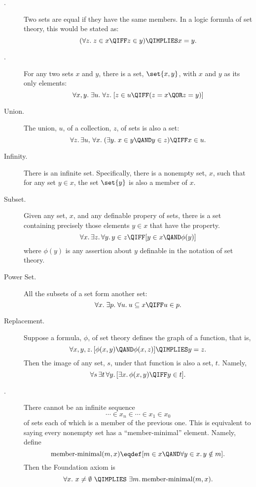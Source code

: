 \begin{description}

\item[.] Two sets are equal if they have the same
  members.  In a logic formula of set theory, this would be stated as:
\[
(\forall z.\; z \in x \QIFF z \in y) \QIMPLIES x = y.
\]

\item[.] For any two sets $x$ and $y$, there is a set,
     $\set{x,y}$, with $x$ and $y$ as its only elements:
\[
\forall x,y.\; \exists u.\; \forall z.\;
[z \in u \QIFF (z = x \QOR z = y)]
\]

\item[Union.] The union, $u$, of a collection, $z$, of sets is also a set:
\[
\forall z.\, \exists u,\, \forall x.\; (\exists y.\; x \in y \QAND y \in z) \QIFF x \in u.
\]

\item[Infinity.]  There is an infinite set.
  Specifically, there is a nonempty set, $x$, such that for any set $y \in
  x$, the set $\set{y}$ is also a member of $x$.


\item[Subset.] Given any set, $x$, and any definable propery of sets,
  there is a set containing precisely those elements $y \in x$ that
  have the property.
\[
\forall x.\, \exists z.\, \forall y.\, y \in z \QIFF [y \in x \QAND \phi(y)]
\]
where $\phi(y)$ is any assertion about $y$ definable in the notation
of set theory.

\item[Power Set.]  All the subsets of a set form another set:
\[
\forall x.\; \exists p.\; \forall u.\: u \subseteq x \QIFF u \in p.
\]

\item[Replacement.]  Suppose a formula, $\phi$,
  of set theory defines the graph of a function, that is,
\[
\forall x, y, z.\, [\phi(x,y) \QAND \phi(x,z)] \QIMPLIES y = z.
\]
Then the image of any set, $s$, under that function is also a set, $t$.  Namely,
\[
\forall s\, \exists t\, \forall y.\, [\exists x.\, \phi(x,y) \QIFF y \in t].
\]

\item[.] 
There cannot be an infinite sequence
\[
\cdots \in x_n \in \cdots \in x_1 \in x_0
\]
of sets each of which is a member of the previous one.  This is equivalent
to saying every nonempty set has a ``member-minimal'' element.  Namely, define
\[
\text{member-minimal}(m, x) \eqdef [m \in x \QAND \forall y \in x.\, y \notin m].
\]
Then the Foundation axiom is
\[
\forall x.\ x \neq \emptyset\ \QIMPLIES\ \exists m.\, \text{member-minimal}(m, x).
\]


\end{description}
